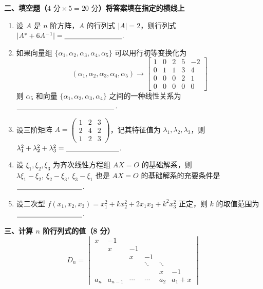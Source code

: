 \documentclass[a4paper,11pt]{ctexart}
\newcommand{\blank}[1][2.8cm]{\underline{\hspace{#1}}}
\begin{document}
\textbf{二、填空题（$4\text{ 分}\times 5 = 20\text{ 分}$）将答案填在指定的横线上}

\begin{enumerate}[label=\arabic*., leftmargin=2em, itemsep=0.9em, topsep=0.6em]
  \item 设 $A$ 是 $n$ 阶方阵，$A$ 的行列式 $|A| = 2$，则行列式 $|A^* + 6A^{-1}| = \blank[2.8cm]$.

  \item 如果向量组 $\{\alpha_1, \alpha_2, \alpha_3, \alpha_4, \alpha_5\}$ 可以用行初等变换化为
  \[
    (\alpha_1, \alpha_2, \alpha_3, \alpha_4, \alpha_5) \to \begin{bmatrix}
      1 & 0 & 2 & 5 & -2 \\
      0 & 1 & 1 & 3 & 4 \\
      0 & 0 & 0 & 2 & 1 \\
      0 & 0 & 0 & 0 & 0
    \end{bmatrix}
  \]
  则 $\alpha_5$ 和向量 $\{\alpha_1, \alpha_2, \alpha_3, \alpha_4\}$ 之间的一种线性关系为 $\blank[4.8cm]$.

  \item 设三阶矩阵 $A = \begin{pmatrix} 1 & 2 & 3 \\ 2 & 4 & 2 \\ 1 & 2 & 3 \end{pmatrix}$，记其特征值为 $\lambda_1, \lambda_2, \lambda_3$，则 $\lambda_1^2 + \lambda_2^2 + \lambda_3^2 = \blank[2.6cm]$.

  \item 设 $\xi_1, \xi_2, \xi_3$ 为齐次线性方程组 $AX = O$ 的基础解系，则 $\lambda\xi_1 - \xi_2,\ \xi_2 - \xi_3,\ \xi_3 - \xi_1$ 也是 $AX = O$ 的基础解系的充要条件是 $\blank[3.2cm]$.

  \item 设二次型 $f(x_1, x_2, x_3) = x_1^2 + k x_2^2 + 2x_1 x_2 + k^2 x_3^2$ 正定，则 $k$ 的取值范围为 $\blank[3.2cm]$.
\end{enumerate}

\vspace{1.0em}

\textbf{三、计算 $n$ 阶行列式的值（8 分）}
\[
  D_n = \begin{vmatrix}
    x & -1 & & & & \\
    & x & -1 & & & \\
    & & x & -1 & & \\
    & & & \ddots & \ddots & \\
    & & & & x & -1 \\
    a_n & a_{n-1} & \cdots & \cdots & a_2 & a_1 + x
  \end{vmatrix}
\]
\end{document}
